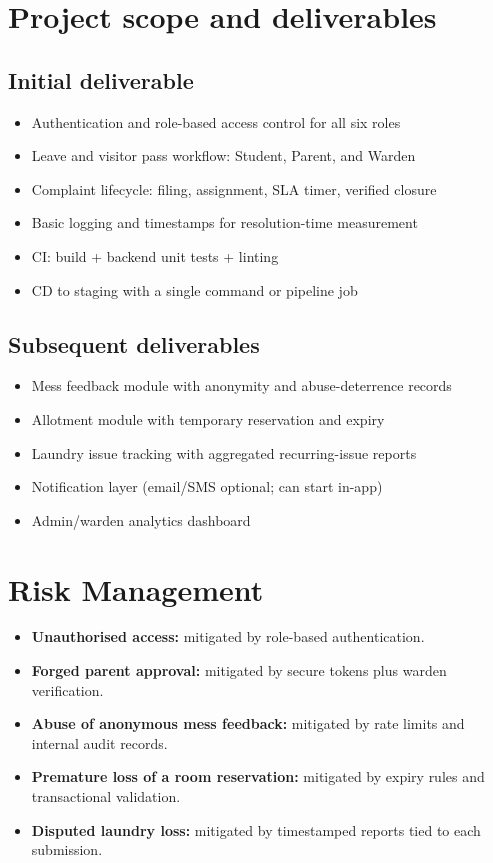 \documentclass[11pt,a4paper]{article}
\begin{document}
\section{Project scope and deliverables }
\subsection{Initial deliverable }
\begin{itemize}[leftmargin=0.7cm]
    \item Authentication and role-based access control for all six roles
    \item Leave and visitor pass workflow: Student, Parent, and Warden
    \item Complaint lifecycle: filing, assignment, SLA timer, verified closure
    \item Basic logging and timestamps for resolution-time measurement
    \item CI: build + backend unit tests + linting
    \item CD to staging with a single command or pipeline job
\end{itemize}

\subsection{Subsequent deliverables}
\begin{itemize}[leftmargin=0.7cm]
    \item Mess feedback module with anonymity and abuse-deterrence records
    \item Allotment module with temporary reservation and expiry
    \item Laundry issue tracking with aggregated recurring-issue reports
    \item Notification layer (email/SMS optional; can start in-app)
    \item Admin/warden analytics dashboard
\end{itemize}

\section{Risk Management}
\begin{itemize}[leftmargin=0.7cm]
    \item \textbf{Unauthorised access:} mitigated by role-based authentication.
    \item \textbf{Forged parent approval:} mitigated by secure tokens plus warden
    verification.
    \item \textbf{Abuse of anonymous mess feedback:} mitigated by rate limits and internal
    audit records.
    \item \textbf{Premature loss of a room reservation:} mitigated by expiry rules and
    transactional validation.
    \item \textbf{Disputed laundry loss:} mitigated by timestamped reports tied to each
    submission.
\end{itemize}
\end{document}
